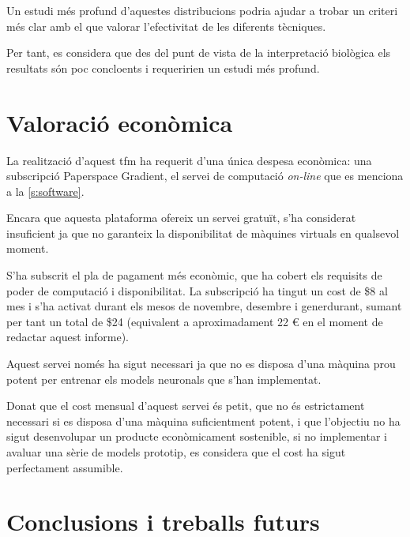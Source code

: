 \documentclass[CAT,BIB]{TFUOC}%
\begin{document}
        Un estudi més profund d'aquestes distribucions
        podria ajudar a trobar un criteri més clar
        amb el que valorar l'efectivitat de les diferents tècniques.

        Per tant,
        es considera que des del punt de vista de la interpretació biològica
        els resultats són poc concloents
        i requeririen un estudi més profund.



\chapter{Valoració econòmica}
\label{c:economic}

    La realització d'aquest \gls{tfm} ha requerit d'una única despesa econòmica:
    una subscripció Paperspace Gradient,
    el servei de computació \textit{on-line}
    que es menciona a la \cref{s:software}.

    Encara que aquesta plataforma ofereix un servei gratuït,
    s'ha considerat insuficient
    ja que no garanteix la disponibilitat de màquines virtuals en qualsevol moment.

    S'ha subscrit el pla de pagament més econòmic,
    que ha cobert els requisits de poder de computació
    i disponibilitat.
    La subscripció ha tingut un cost de \$8 al mes
    i s'ha activat durant els mesos de novembre, desembre i generdurant,
    sumant per tant un total de \$24
    (equivalent a aproximadament 22 € en el moment de redactar aquest informe).

    Aquest servei només ha sigut necessari
    ja que no es disposa d'una màquina prou potent
    per entrenar els models neuronals que s'han implementat.

    Donat que el cost mensual d'aquest servei és petit,
    que no és estrictament necessari
    si es disposa d'una màquina suficientment potent,
    i que l'objectiu no ha sigut desenvolupar un producte econòmicament sostenible,
    si no implementar i avaluar una sèrie de models prototip,
    es considera que el cost ha sigut perfectament assumible.


\chapter{Conclusions i treballs futurs}
\label{c:conclusions}
\end{document}
